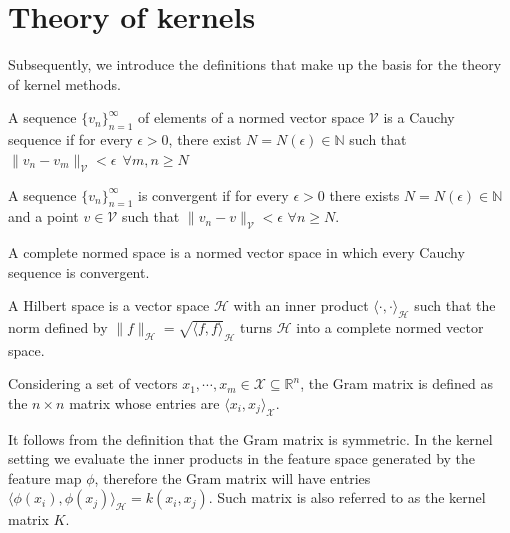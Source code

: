 \section{Theory of kernels}
Subsequently, we introduce the definitions that make up the basis for the theory of kernel methods.


\begin{definition}
    A sequence $\{v_n\}_{n=1}^{\infty}$ of elements of a normed vector space $\mathcal{V}$ is a Cauchy sequence if for every $\epsilon>0$, there exist $N=N(\epsilon) \in \mathbb{N}$ such that $\|v_n-v_m\|_{\mathcal{V}}<\epsilon \ \ \forall m,n\geq N$  
\end{definition}

\begin{definition}
    A sequence $\{v_n\}_{n=1}^{\infty}$ is convergent if for every $\epsilon>0$ there exists $N=N(\epsilon) \in \mathbb{N}$ and a point $ v \in \mathcal{V}$ such that  $\|v_n-v\|_{\mathcal{V}} < \epsilon$ $\forall n\geq N$.
\end{definition}

\begin{definition}
    A complete normed space is a normed vector space in which every Cauchy sequence is convergent.
\end{definition}


\begin{definition}
    A Hilbert space is a vector space $\mathcal{H}$ with an inner product $\langle \cdot, \cdot \rangle_{\mathcal{H}}$ such that the norm defined by $\|f\|_{\mathcal{H}}=\sqrt{\langle f, f \rangle}_{\mathcal{H}}$
turns $\mathcal{H}$ into a complete normed vector space.
\end{definition}




\begin{definition}
    Considering a set of vectors $x_1, \cdots, x_m \in \mathcal{X} \subseteq \mathbb{R}^n$, the Gram matrix is defined as the $n\times n$ matrix whose entries are $\langle x_i, x_j \rangle_{\mathcal{X}}$.    
\end{definition}

It follows from the definition that the Gram matrix is symmetric.
In the kernel setting we evaluate the inner products in the feature space generated by the feature map $\phi$, therefore the Gram matrix will have entries $\langle \phi(x_i), \phi(x_j) \rangle_{\mathcal{H}}= k(x_i, x_j)$. Such matrix is also referred to as the kernel matrix $K$.

